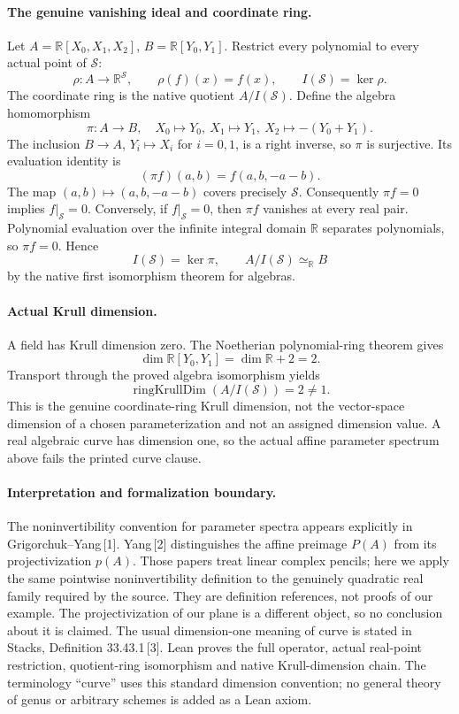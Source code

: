 \documentclass[11pt]{article}
\newcommand{\R}{\mathbb R}
\newcommand{\Specpar}{\mathcal S}
\begin{document}
\paragraph{The genuine vanishing ideal and coordinate ring.}
Let $A=\R[X_0,X_1,X_2]$, $B=\R[Y_0,Y_1]$.
Restrict every polynomial to every actual point of $\Specpar$:
\[
 \rho:A\longrightarrow\R^{\Specpar},\qquad
 \rho(f)(x)=f(x),\qquad I(\Specpar)=\ker\rho.
\]
The coordinate ring is the native quotient $A/I(\Specpar)$.
Define the algebra homomorphism
\[
 \pi:A\longrightarrow B,\quad
 X_0\mapsto Y_0,\ X_1\mapsto Y_1,\ X_2\mapsto-(Y_0+Y_1).
\]
The inclusion $B\to A$, $Y_i\mapsto X_i$ for $i=0,1$, is a right inverse,
so $\pi$ is surjective. Its evaluation identity is
\[
 (\pi f)(a,b)=f(a,b,-a-b).
\]
The map $(a,b)\mapsto(a,b,-a-b)$ covers precisely $\Specpar$.
Consequently $\pi f=0$ implies $f|_{\Specpar}=0$.
Conversely, if $f|_{\Specpar}=0$, then $\pi f$ vanishes at every real
pair. Polynomial evaluation over the infinite integral domain $\R$
separates polynomials, so $\pi f=0$. Hence
\[
 I(\Specpar)=\ker\pi,\qquad A/I(\Specpar)\simeq_{\R}B
\]
by the native first isomorphism theorem for algebras.

\paragraph{Actual Krull dimension.}
A field has Krull dimension zero. The Noetherian polynomial-ring theorem
gives
\[
 \dim\R[Y_0,Y_1]=\dim\R+2=2.
\]
Transport through the proved algebra isomorphism yields
\[
 \operatorname{ringKrullDim}(A/I(\Specpar))=2\ne1.
\]
This is the genuine coordinate-ring Krull dimension, not the vector-space
dimension of a chosen parameterization and not an assigned dimension value.
A real algebraic curve has dimension one, so the actual affine parameter
spectrum above fails the printed curve clause.

\paragraph{Interpretation and formalization boundary.}
The noninvertibility convention for parameter spectra appears explicitly
in Grigorchuk--Yang\,[1]. Yang\,[2] distinguishes the affine preimage
$P(A)$ from its projectivization $p(A)$. Those papers treat linear complex
pencils; here we apply the same pointwise noninvertibility definition to
the genuinely quadratic real family required by the source. They are
definition references, not proofs of our example. The projectivization
of our plane is a different object, so no conclusion about it is claimed.
The usual dimension-one meaning of curve is stated in Stacks,
Definition 33.43.1\,[3]. Lean proves the full operator, actual real-point
restriction, quotient-ring isomorphism and native Krull-dimension chain.
The terminology ``curve'' uses this standard dimension convention; no
general theory of genus or arbitrary schemes is added as a Lean axiom.
\end{document}

